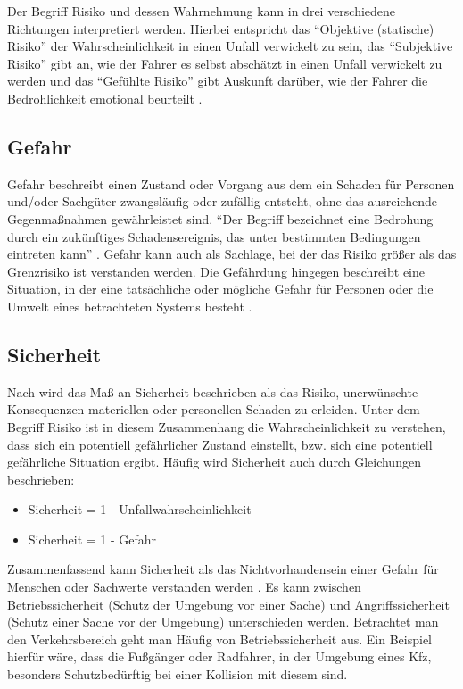 Der Begriff Risiko und dessen Wahrnehmung kann in drei verschiedene Richtungen interpretiert werden. Hierbei entspricht das \enquote{Objektive (statische) Risiko} der Wahrscheinlichkeit in einen Unfall verwickelt zu sein, das \enquote{Subjektive Risiko} gibt an, wie der Fahrer es selbst abschätzt in einen Unfall verwickelt zu werden und das \enquote{Gefühlte Risiko} gibt Auskunft darüber, wie der Fahrer die Bedrohlichkeit emotional beurteilt \parencite[S. 461f]{Fuller.2005}.

\subsection{Gefahr}
Gefahr beschreibt einen Zustand oder Vorgang aus dem ein Schaden für Personen und/oder Sachgüter zwangsläufig oder zufällig entsteht, ohne das ausreichende Gegenmaßnahmen gewährleistet sind. \enquote{Der Begriff bezeichnet eine Bedrohung durch ein zukünftiges Schadensereignis, das unter bestimmten Bedingungen eintreten kann} \parencite[S. 8]{Hoffmann.26.04.2013}. Gefahr kann auch als Sachlage, bei der das Risiko größer als das Grenzrisiko ist verstanden werden. Die Gefährdung hingegen beschreibt eine Situation, in der eine tatsächliche oder mögliche Gefahr für Personen oder die Umwelt eines betrachteten Systems besteht \parencite[S. 43f]{Hillenbrand.2012}.

\subsection{Sicherheit}
Nach \Textcite[S. 40]{Fricke.2006} wird das Maß an Sicherheit beschrieben als das Risiko, unerwünschte Konsequenzen materiellen oder personellen Schaden zu erleiden. Unter dem Begriff Risiko ist in diesem Zusammenhang die Wahrscheinlichkeit zu verstehen, dass sich ein potentiell gefährlicher Zustand einstellt, bzw. sich eine potentiell gefährliche Situation ergibt. Häufig wird Sicherheit auch durch Gleichungen beschrieben:

\begin{itemize}
	\item Sicherheit = 1 - Unfallwahrscheinlichkeit \parencite[S. 24]{Hoffmann.26.04.2013}
	\item Sicherheit = 1 - Gefahr \parencite[S. 42]{Hillenbrand.2012}
\end{itemize}

Zusammenfassend kann Sicherheit als das Nichtvorhandensein einer Gefahr für Menschen oder Sachwerte verstanden werden \parencite[S. 42]{Hillenbrand.2012}. Es kann zwischen Betriebssicherheit (Schutz der Umgebung vor einer Sache) und Angriffssicherheit (Schutz einer Sache vor der Umgebung) unterschieden werden. Betrachtet man den Verkehrsbereich geht man Häufig von Betriebssicherheit aus. Ein Beispiel hierfür wäre, dass die Fußgänger oder Radfahrer, in der Umgebung eines Kfz, besonders Schutzbedürftig bei einer Kollision mit diesem sind. 

